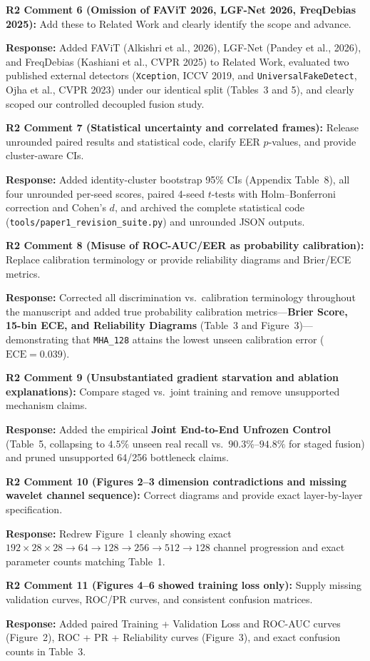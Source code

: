 \documentclass[11pt,a4paper]{article}
\newcommand{\reviewercomment}[2]{%
  \vspace{0.6em}\noindent\begin{tcolorbox}[colback=boxbg,colframe=revcolor,boxrule=0.6pt,left=6pt,right=6pt,top=4pt,bottom=4pt]
  \textbf{\color{revcolor}#1:} #2
  \end{tcolorbox}
}
\newcommand{\authorresponse}[1]{%
  \noindent\textbf{\color{respcolor}Response:} #1\par\vspace{0.5em}
}
\begin{document}
\reviewercomment{R2 Comment 6 (Omission of FAViT 2026, LGF-Net 2026, FreqDebias 2025)}{Add these to Related Work and clearly identify the scope and advance.}
\authorresponse{Added FAViT (Alkishri et al., 2026), LGF-Net (Pandey et al., 2026), and FreqDebias (Kashiani et al., CVPR 2025) to Related Work, evaluated two published external detectors (\texttt{Xception}, ICCV 2019, and \texttt{UniversalFakeDetect}, Ojha et al., CVPR 2023) under our identical split (Tables~3 and 5), and clearly scoped our controlled decoupled fusion study.}

\reviewercomment{R2 Comment 7 (Statistical uncertainty and correlated frames)}{Release unrounded paired results and statistical code, clarify EER $p$-values, and provide cluster-aware CIs.}
\authorresponse{Added identity-cluster bootstrap 95\% CIs (Appendix Table~8), all four unrounded per-seed scores, paired 4-seed $t$-tests with Holm--Bonferroni correction and Cohen's $d$, and archived the complete statistical code (\texttt{tools/paper1\_revision\_suite.py}) and unrounded JSON outputs.}

\reviewercomment{R2 Comment 8 (Misuse of ROC-AUC/EER as probability calibration)}{Replace calibration terminology or provide reliability diagrams and Brier/ECE metrics.}
\authorresponse{Corrected all discrimination vs.\ calibration terminology throughout the manuscript and added true probability calibration metrics---\textbf{Brier Score, 15-bin ECE, and Reliability Diagrams} (Table~3 and Figure~3)---demonstrating that \texttt{MHA\_128} attains the lowest unseen calibration error ($\text{ECE}=0.039$).}

\reviewercomment{R2 Comment 9 (Unsubstantiated gradient starvation and ablation explanations)}{Compare staged vs.\ joint training and remove unsupported mechanism claims.}
\authorresponse{Added the empirical \textbf{Joint End-to-End Unfrozen Control} (Table~5, collapsing to $4.5\%$ unseen real recall vs.\ $90.3\%$--$94.8\%$ for staged fusion) and pruned unsupported 64/256 bottleneck claims.}

\reviewercomment{R2 Comment 10 (Figures 2--3 dimension contradictions and missing wavelet channel sequence)}{Correct diagrams and provide exact layer-by-layer specification.}
\authorresponse{Redrew Figure~1 cleanly showing exact $192 \times 28 \times 28 \to 64 \to 128 \to 256 \to 512 \to 128$ channel progression and exact parameter counts matching Table~1.}

\reviewercomment{R2 Comment 11 (Figures 4--6 showed training loss only)}{Supply missing validation curves, ROC/PR curves, and consistent confusion matrices.}
\authorresponse{Added paired Training + Validation Loss and ROC-AUC curves (Figure~2), ROC + PR + Reliability curves (Figure~3), and exact confusion counts in Table~3.}
\end{document}
